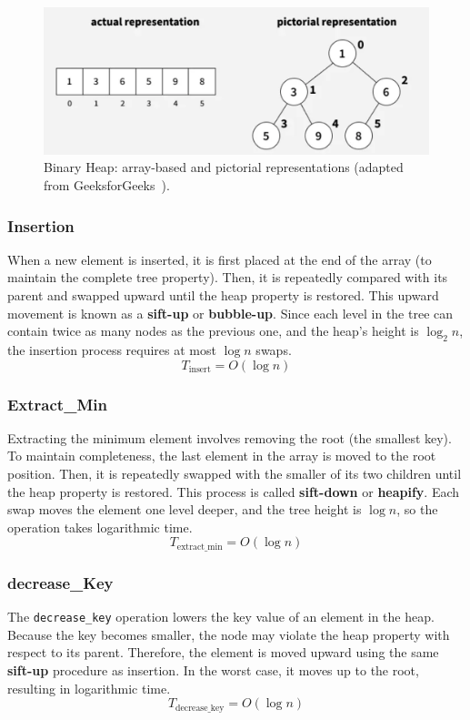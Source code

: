 \documentclass[acmsmall]{acmart}
\begin{document}
\begin{figure}[H]
  \centering
  \includegraphics[width=0.85\linewidth]{figs/binary_heap.png}
  \caption{Binary Heap: array-based and pictorial representations (adapted from GeeksforGeeks~\cite{geeksforgeeks_binaryheap}).}
  \label{fig:binaryheap}
\end{figure}

\subsubsection*{Insertion}
When a new element is inserted, it is first placed at the end of the array (to maintain the complete tree property). Then, it is repeatedly compared with its parent and swapped upward until the heap property is restored. This upward movement is known as a \textbf{sift-up} or \textbf{bubble-up}.  
Since each level in the tree can contain twice as many nodes as the previous one, and the heap’s height is $\log_2 n$, the insertion process requires at most $\log n$ swaps.  
\[
T_{\text{insert}} = O(\log n)
\]

\subsubsection*{Extract\_Min}
Extracting the minimum element involves removing the root (the smallest key). To maintain completeness, the last element in the array is moved to the root position. Then, it is repeatedly swapped with the smaller of its two children until the heap property is restored. This process is called \textbf{sift-down} or \textbf{heapify}.  
Each swap moves the element one level deeper, and the tree height is $\log n$, so the operation takes logarithmic time.  
\[
T_{\text{extract\_min}} = O(\log n)
\]

\subsubsection*{decrease\_Key}
The \texttt{decrease\_key} operation lowers the key value of an element in the heap. Because the key becomes smaller, the node may violate the heap property with respect to its parent. Therefore, the element is moved upward using the same \textbf{sift-up} procedure as insertion. In the worst case, it moves up to the root, resulting in logarithmic time.  
\[
T_{\text{decrease\_key}} = O(\log n)
\]
\end{document}
